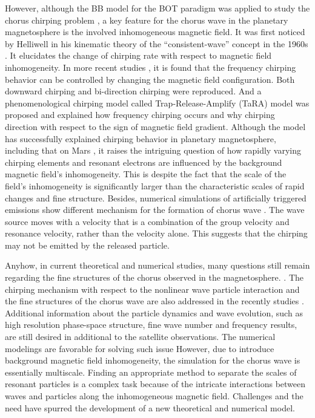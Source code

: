 However, although the BB model for the BOT paradigm was applied to study the chorus chirping problem \cite{soto-chavez2014}, a key feature for the chorus wave in the planetary magnetosphere is the involved inhomogeneous magnetic field. 
It was first noticed by Helliwell in his kinematic theory of the ``consistent-wave'' concept in the 1960s \cite{helliwell_theory_1967}.
It elucidates the change of chirping rate with respect to magnetic field inhomogeneity.
In more recent studies \cite{wu_controlling_2020,fujiwara2023}, it is found that the frequency chirping behavior can be controlled by changing the magnetic field configuration. Both downward chirping and bi-direction chirping were reproduced.
And a phenomenological chirping model called Trap-Release-Amplify (TaRA) model \cite{tao_trap-release-amplify_2021} was proposed and explained how frequency chirping occurs and why chirping direction with respect to the sign of magnetic field gradient.
Although the model has successfully explained chirping behavior in planetary magnetosphere, including that on Mars \cite{teng2023}, it raises the intriguing question of how rapidly varying chirping elements and resonant electrons are influenced by the background magnetic field's inhomogeneity.
This is despite the fact that the scale of the field's inhomogeneity is significantly larger than the characteristic scales of rapid changes and fine structure.
Besides, numerical simulations of artificially triggered emissions show different mechanism for the formation of chorus wave \cite{nogi2022,nogi2023}. 
The wave source moves with a velocity that is a combination of the group velocity and resonance velocity, rather than the velocity alone. This suggests that the chirping may not be emitted by the released particle.

Anyhow, in current theoretical and numerical studies, many questions still remain regarding the fine structures of the chorus observed in the magnetosphere. \cite{zhang2021}. 
The chirping mechanism with respect to the nonlinear wave particle interaction and the fine structures of the chorus wave are also addressed in the recently studies \cite{omura_nonlinear_2021,gao2014a,li2019b}.
Additional information about the particle dynamics and wave evolution, such as high resolution phase-space structure, fine wave number and frequency results, are still desired in additional to the satellite observations.
The numerical modelings are favorable for solving such issue \cite{katoh_computer_2007,vhscode,xiao2015,xiao2020explicit,xie2022,tao_numerical_2014,chen2015a}
However, due to introduce background magnetic field inhomogeneity, the simulation for the chorus wave is essentially multiscale.
Finding an appropriate method to separate the scales of resonant particles is a complex task because of the intricate interactions between waves and particles along the inhomogeneous magnetic field. 
Challenges and the need have spurred the development of a new theoretical and numerical model.

